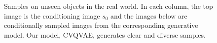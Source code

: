 \begin{figure}[t]
\begin{subfigure}[c]{0.3\textwidth}
{            %
        }
    \end{subfigure}

    \caption{Samples on unseen objects in the real world. In each column, the top image is the conditioning image $s_0$ and the images below are conditionally sampled images from the corresponding generative model. Our model, CVQVAE, generates clear and diverse samples.}
    \label{fig:real_samples}
\end{figure}